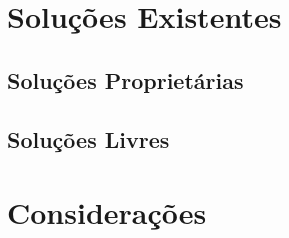 
\section{Soluções Existentes}

\subsection{Soluções Proprietárias}

\subsection{Soluções Livres}

\section{Considerações}


